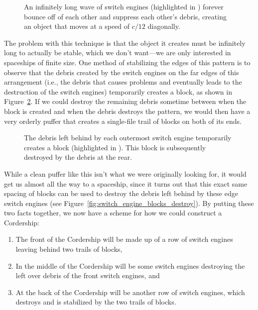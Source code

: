 \begin{figure}[!htb]
	\centering{}
	\caption{An infinitely long wave of switch engines (highlighted in ) forever bounce off of each other and suppress each other's debris, creating an object that moves at a speed of $c/12$ diagonally.}\label{fig:switch_engine_infinite}
\end{figure}

The problem with this technique is that the object it creates must be infinitely long to actually be stable, which we don't want---we are only interested in spaceships of finite size. One method of stabilizing the edges of this pattern is to observe that the debris created by the switch engines on the far edges of this arrangement (i.e., the debris that causes problems and eventually leads to the destruction of the switch engines) temporarily creates a block, as shown in Figure~\ref{fig:switch_engine_blocks}. If we could destroy the remaining debris sometime between when the block is created and when the debris destroys the pattern, we would then have a very orderly puffer that creates a single-file trail of blocks on both of its ends.

\begin{figure}[!htb]
	\centering{}
	\caption{The debris left behind by each outermost switch engine temporarily creates a block (highlighted in ). This block is subsequently destroyed by the debris at the rear.}\label{fig:switch_engine_blocks}
\end{figure}

While a clean puffer like this isn't what we were originally looking for, it would get us almost all the way to a spaceship, since it turns out that this exact same spacing of blocks can be used to destroy the debris left behind by these edge switch engines (see Figure~\ref{fig:switch_engine_blocks_destroy}). By putting these two facts together, we now have a scheme for how we could construct a Cordership:\smallskip

\begin{enumerate}
	\item[1)] The front of the Cordership will be made up of a row of switch engines leaving behind two trails of blocks,\smallskip
	
	\item[2)] In the middle of the Cordership will be some switch engines destroying the left over debris of the front switch engines, and\smallskip
	
	\item[3)] At the back of the Cordership will be another row of switch engines, which destroys and is stabilized by the two trails of blocks.\smallskip
\end{enumerate}

